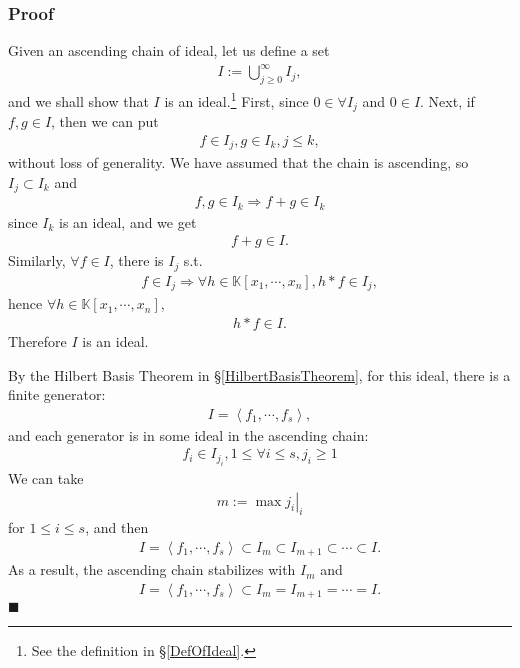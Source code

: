 \documentclass[11pt]{book}
\begin{document}
\subsubsection{Proof}
Given an ascending chain of ideal, let us define a set
\begin{eqnarray}
\label{BigI}
I := \bigcup_{j\geq 0}^\infty I_j,
\end{eqnarray}
and we shall show that $I$ is an ideal.\footnote{ See the definition in \S\ref{DefOfIdeal}.}
First, since $0 \in \forall I_j$ and $0\in I$.
Next, if $f,g \in I$, then we can put 
\begin{eqnarray}
f \in I_j, g \in I_k, j \leq k,
\end{eqnarray}
without loss of generality.
We have assumed that the chain is ascending, so $I_j \subset I_k$ and
\begin{eqnarray}
f,g \in I_k \Rightarrow f+g \in I_k
\end{eqnarray}
since $I_k$ is an ideal, and we get
\begin{eqnarray}
f+g \in I.
\end{eqnarray}
Similarly, $\forall f \in I$, there is $I_j$ s.t.
\begin{eqnarray}
f \in I_j \Rightarrow \forall h \in \mathbb{K}[x_1, \cdots, x_n], h*f \in I_j,
\end{eqnarray}
hence $\forall h \in \mathbb{K}[x_1, \cdots, x_n]$, 
\begin{eqnarray}
h*f \in I.
\end{eqnarray}
Therefore $I$ is an ideal.

By the Hilbert Basis Theorem in \S\ref{HilbertBasisTheorem}, for this ideal, there is a finite generator:
\begin{eqnarray}
I = \left<f_1, \cdots, f_s \right>,
\end{eqnarray}
and each generator is in some ideal in the ascending chain:
\begin{eqnarray}
f_i \in I_{j_i}, 1 \leq \forall i \leq s, j_i \geq 1
\end{eqnarray}
We can take 
\begin{eqnarray}
m := \left. \max j_i \right|_i
\end{eqnarray}
for $1 \leq i \leq s$, and then
\begin{eqnarray}
I = \left<f_1, \cdots, f_s \right> \subset I_m \subset I_{m+1} \subset \cdots \subset I.
\end{eqnarray}
As a result, the ascending chain stabilizes with $I_m$ and 
\begin{eqnarray}
I = \left<f_1, \cdots, f_s \right> \subset I_m = I_{m+1} = \cdots = I.
\end{eqnarray}
$\blacksquare$
\end{document}
